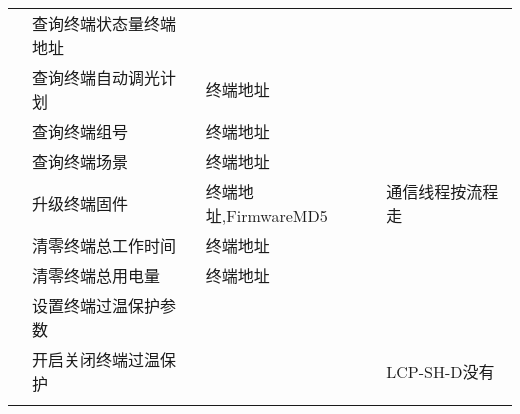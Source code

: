 \begin{longtabu}[c]{@{}rXXX@{}}
\\ & 查询终端状态量终端地址 & &
\\ & 查询终端自动调光计划 & 终端地址 &
\\ & 查询终端组号 & 终端地址 &
\\ & 查询终端场景 & 终端地址 &
\\ & 升级终端固件 & 终端地址,FirmwareMD5 & 通信线程按流程走
\\ & 清零终端总工作时间 & 终端地址 &
\\ & 清零终端总用电量 & 终端地址 &
\\ & 设置终端过温保护参数 & &
\\ & 开启关闭终端过温保护 & & LCP-SH-D没有
\\\addlinespace
\bottomrule
\end{longtabu}
